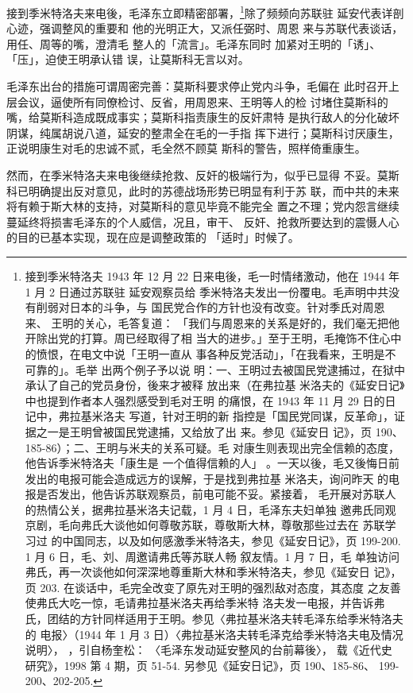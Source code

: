  接到季米特洛夫来电後，毛泽东立即精密部署，\footnote{接到季米特洛夫 1943
 年 12 月 22 日来电後，毛一时情绪激动，他在 1944 年 1 月 2 日通过苏联驻
 延安观察员给 季米特洛夫发出一份覆电。毛声明中共没有削弱对日本的斗争，与
 国民党合作的方针也没有改变。针对季氏对周恩来、 王明的关心，毛答复道：
 「我们与周恩来的关系是好的，我们毫无把他开除出党的打算。周已经取得了相
 当大的进步。」至于王明，毛掩饰不住心中的愤恨，在电文中说「王明一直从
 事各种反党活动」，「在我看来，王明是不可靠的」。毛举 出两个例子予以说
 明：一、王明过去被国民党逮捕过，在狱中承认了自己的党员身份，後来才被释
 放出来（在弗拉基 米洛夫的《延安日记》中也提到作者本人强烈感受到毛对王明
 的痛恨，在 1943 年 11 月 29 日的日记中，弗拉基米洛夫 写道，针对王明的新
 指控是「国民党同谋，反革命」，证据之一是王明曾被国民党逮捕，又给放了出
 来。参见《延安日 记》，页 190、185-86）；二、王明与米夫的关系可疑。毛
 对康生则表现出完全信赖的态度，他告诉季米特洛夫「康生是 一个值得信赖的人」
 。一天以後，毛又後悔日前发出的电报可能会造成远方的误解，于是找到弗拉基
 米洛夫，询问昨天 的电报是否发出，他告诉苏联观察员，前电可能不妥。紧接着，
 毛开展对苏联人的热情公关，据弗拉基米洛夫记载，1 月 4 日，毛泽东夫妇单独
 邀弗氏同观京剧，毛向弗氏大谈他如何尊敬苏联，尊敬斯大林，尊敬那些过去在
 苏联学习过 的中国同志，以及如何感激季米特洛夫，参见《延安日记》，页
 199-200. 1 月 6 日，毛、刘、周邀请弗氏等苏联人畅 叙友情。1 月 7 日，毛
 单独访问弗氏，再一次谈他如何深深地尊重斯大林和季米特洛夫，参见《延安日
 记》，页 203.  在谈话中，毛完全改变了原先对王明的强烈敌对态度，其态度
 之友善使弗氏大吃一惊，毛请弗拉基米洛夫再给季米特 洛夫发一电报，并告诉弗
 氏，团结的方针同样适用于王明。参见〈弗拉基米洛夫转毛泽东给季米特洛夫的
 电报〉（1944 年 1 月 3 日）〈弗拉基米洛夫转毛泽克给季米特洛夫电及情况
 说明〉， ，引自杨奎松： 〈毛泽东发动延安整风的台前幕後〉， 载《近代史
 研究》，1998 第 4 期，页 51-54. 另参见《延安日记》，页 190、185-86、
 199-200、202-205.  }除了频频向苏联驻 延安代表详剖心迹，强调整风的重要和
 他的光明正大，又派任弼时、周恩 来与苏联代表谈话，用任、周等的嘴，澄清毛
 整人的「流言」。毛泽东同时 加紧对王明的「诱」、「压」，迫使王明承认错
 误，让莫斯科无言以对。

毛泽东出台的措施可谓周密完善：莫斯科要求停止党内斗争，毛偏在
此时召开上层会议，逼使所有同僚检讨、反省，用周恩来、王明等人的检
讨堵住莫斯科的嘴，给莫斯科造成既成事实；莫斯科指责康生的反奸肃特
是执行敌人的分化破坏阴谋，纯属胡说八道，延安的整肃全在毛的一手指
挥下进行；莫斯科讨厌康生，正说明康生对毛的忠诚不贰，毛全然不顾莫
斯科的警告，照样倚重康生。
 
然而，在季米特洛夫来电後继续抢救、反奸的极端行为，似乎已显得
不妥。莫斯科已明确提出反对意见，此时的苏德战场形势已明显有利于苏
联，而中共的未来将有赖于斯大林的支持，对莫斯科的意见毕竟不能完全
置之不理；党内怨言继续蔓延终将损害毛泽东的个人威信，况且，审干、
反奸、抢救所要达到的震慑人心的目的已基本实现，现在应是调整政策的
「适时」时候了。

